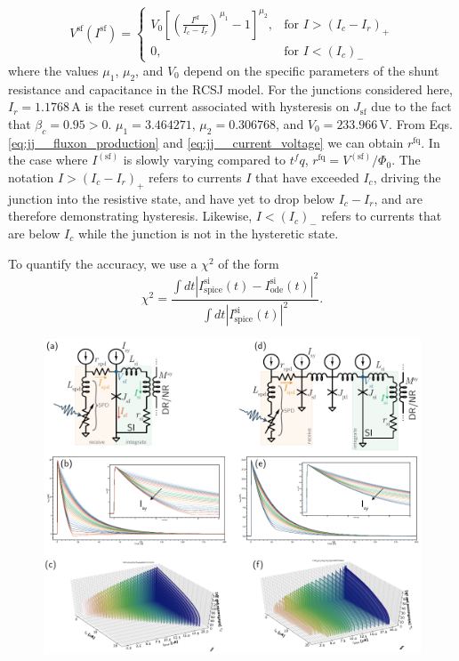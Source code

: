 \documentclass[twocolumn]{article}
\begin{document}
\begin{equation}
\label{eq:jj__current_voltage}
V^{\mathrm{sf}}(I^{\mathrm{sf}}) = \begin{cases} V_0\left[ \left( \frac{I^{\mathrm{sf}}}{I_c-I_r} \right)^{\mu_1} - 1 \right]^{\mu_2}, & \text{for } I > (I_c-I_r)_+ \\
0, & \text{for } I < (I_c)_-
\end{cases}
\end{equation} 
where the values $\mu_1$, $\mu_2$, and $V_0$ depend on the specific parameters of the shunt resistance and capacitance in the RCSJ model. For the junctions considered here, $I_r = 1.1768$\,\textmu A is the reset current associated with hysteresis on $J_{\mathrm{sf}}$ due to the fact that $\beta_c = 0.95 > 0$. $\mu_1 = 3.464271$, $\mu_2 = 0.306768$, and $V_0 = 233.966$\,\textmu V. From Eqs.\,\ref{eq:jj__fluxon_production} and \ref{eq:jj__current_voltage} we can obtain $r^{\mathrm{fq}}$. In the case where $I^{(\mathrm{sf})}$ is slowly varying compared to $t^fq$, $ r^{\mathrm{fq}} = V^{(\mathrm{sf})}/\Phi_0$. The notation $I > (I_c-I_r)_+$ refers to currents $I$ that have exceeded $I_c$, driving the junction into the resistive state, and have yet to drop below $I_c-I_r$, and are therefore demonstrating hysteresis. Likewise, $I<(I_c)_-$ refers to currents that are below $I_c$ while the junction is not in the hysteretic state.

To quantify the accuracy, we use a $\chi^2$ of the form
\begin{equation}
\label{eq:chi_squared}
\chi^2 = \frac{\int dt \left|I^{\mathrm{si}}_{\mathrm{spice}}(t) - I^{\mathrm{si}}_{\mathrm{ode}}(t)\right|^2}{\int dt \left|I^{\mathrm{si}}_{\mathrm{spice}}(t)\right|^2}.
\end{equation}

\begin{figure}[h!]
\includegraphics[width=17.2cm]{figures/_fig__synapses__circuits__responses.pdf}
\end{figure}
\end{document}
